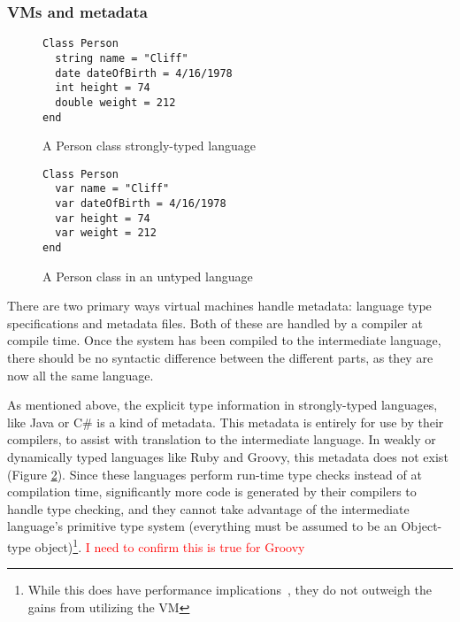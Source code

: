 \documentclass{sig-alternate}
\newcommand{\mycomment}[1]{\textcolor{red}{#1}}
\begin{document}
\subsubsection*{VMs and metadata}

\begin{figure}
\begin{verbatim}
Class Person
  string name = "Cliff"
  date dateOfBirth = 4/16/1978
  int height = 74
  double weight = 212
end
\end{verbatim}
\caption{A Person class strongly-typed language}
\label{typedExample}
\end{figure}

\begin{figure}
\begin{verbatim}
Class Person
  var name = "Cliff"
  var dateOfBirth = 4/16/1978
  var height = 74
  var weight = 212
end
\end{verbatim}
\caption{A Person class in an untyped language}
\label{untypedExample}
\end{figure}





There are two primary ways virtual machines handle metadata: language type specifications and metadata files. Both of these are handled by a compiler at compile time.
Once the system has been compiled to the intermediate language, there should be no syntactic difference between the different parts, as they are now all the same language.

As mentioned above, the explicit type information in \linebreak
strongly-typed languages, like Java or C\# is a kind of metadata. This metadata is entirely for use by their compilers, to assist with translation to the intermediate language.
In weakly or dynamically typed languages like Ruby and Groovy, this metadata does not exist (Figure \ref{untypedExample}). Since these languages perform run-time type checks instead of at compilation time, significantly more code is generated by their compilers to handle type checking, and they cannot take advantage of the intermediate language's primitive type system (everything must be assumed to be an Object-type object)\footnote{While this does have performance implications~\cite{Li:2013}, they do not outweigh the gains from utilizing the VM}.
\mycomment{I need to confirm this is true for Groovy}
\end{document}
